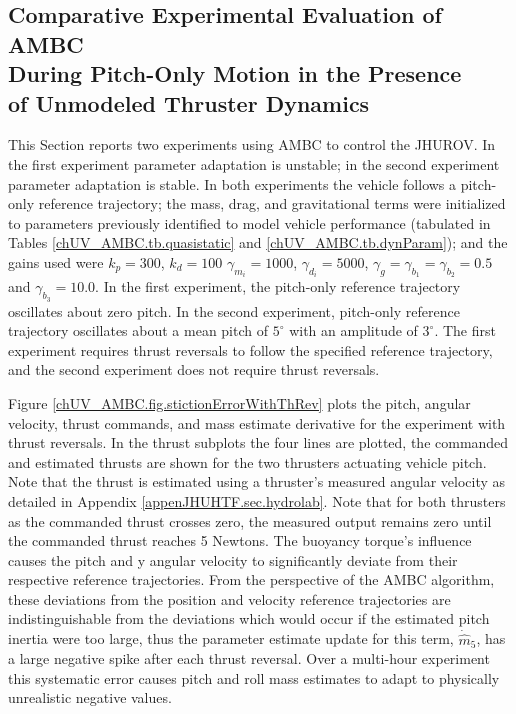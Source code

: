 \subsection{Comparative Experimental Evaluation of \ac{AMBC} \\
                 During Pitch-Only Motion in the Presence \\
                 of Unmodeled Thruster Dynamics}
\label{chUV_AMBC.sec.singleDOFAnalysisFailure}


This Section reports two experiments using \ac{AMBC} to control the
\ac{JHUROV}. In the first experiment parameter adaptation is unstable;
in the second experiment parameter adaptation is stable. In both
experiments the vehicle follows a pitch-only reference trajectory; the
mass, drag, and gravitational terms were initialized to parameters
previously identified to model vehicle performance (tabulated in
Tables \ref{chUV_AMBC.tb.quasistatic} and
\ref{chUV_AMBC.tb.dynParam}); and the gains used were $k_p=300$,
$k_d=100$ $\gamma_{m_i}=1000$, $\gamma_{d_i}=5000$,
$\gamma_{g}=\gamma_{b_1}=\gamma_{b_2}=0.5$ and $\gamma_{b_3}=10.0$.
In the first experiment, the pitch-only reference trajectory
oscillates about zero pitch.  In the second experiment, pitch-only
reference trajectory oscillates about a mean pitch of $5^\circ$ with
an amplitude of $3^\circ$.  The first experiment requires thrust
reversals to follow the specified reference trajectory, and the second
experiment does not require thrust reversals.

Figure \ref{chUV_AMBC.fig.stictionErrorWithThRev} plots the pitch,
angular velocity, thrust commands, and mass estimate derivative for
the experiment with thrust reversals.  In the thrust subplots the four
lines are plotted, the commanded and estimated thrusts are shown for
the two thrusters actuating vehicle pitch.  Note that the thrust is
estimated using a thruster's measured angular velocity as detailed in
Appendix \ref{appenJHUHTF.sec.hydrolab}.  Note that for both thrusters
as the commanded thrust crosses zero, the measured output remains zero
until the commanded thrust reaches 5 Newtons.  The buoyancy torque's
influence causes the pitch and y angular velocity to significantly
deviate from their respective reference trajectories.  From the
perspective of the \ac{AMBC} algorithm, these deviations from the
position and velocity reference trajectories are indistinguishable
from the deviations which would occur if the estimated pitch inertia
were too large, thus the parameter estimate update for this term,
$\dot{\hat{m}}_5$, has a large negative spike after each thrust
reversal. Over a multi-hour experiment this systematic error causes
pitch and roll mass estimates to adapt to physically unrealistic
negative values.

